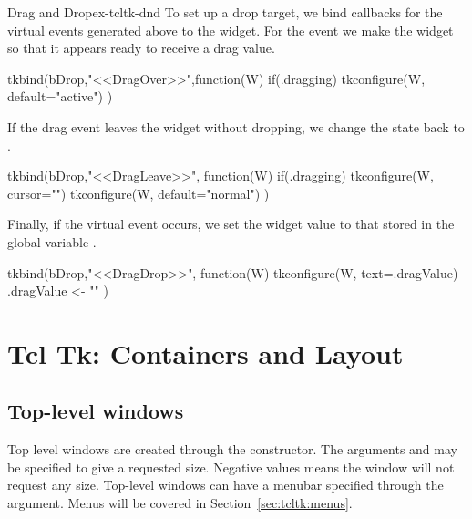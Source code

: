 \begin{example}{Drag and Drop}{ex-tcltk-dnd}
To set up a drop target, we  bind callbacks for the virtual events generated above to the widget. For the  event we make the widget  so that it appears ready to receive a drag value.
\begin{Schunk}
\begin{Sinput}
 tkbind(bDrop,"<<DragOver>>",function(W) {
   if(.dragging) 
     tkconfigure(W, default="active")
 })
\end{Sinput}
\end{Schunk}
If the drag event leaves the widget without dropping, we change the state back to .
\begin{Schunk}
\begin{Sinput}
 tkbind(bDrop,"<<DragLeave>>", function(W) {
   if(.dragging)  {
     tkconfigure(W, cursor="")
     tkconfigure(W, default="normal")  
    }
 })
\end{Sinput}
\end{Schunk}
Finally, if the  virtual event occurs, we set the widget value to that stored in the global variable .
\begin{Schunk}
\begin{Sinput}
 tkbind(bDrop,"<<DragDrop>>", function(W) {
   tkconfigure(W, text=.dragValue)
   .dragValue <- ""
 })
\end{Sinput}
\end{Schunk}
\end{example}





\chapter{Tcl Tk: Containers and Layout}
\label{sec:tcltk:basic-containers}

\section{Top-level windows}
\label{sec:tcltk:top-level-windows}

Top level windows are created through the 
constructor. The arguments  and  may be
specified to give a requested size. Negative values means the window
will not request any size. Top-level windows can have a menubar specified through the  argument. Menus will be covered
in Section~\ref{sec:tcltk:menus}.

